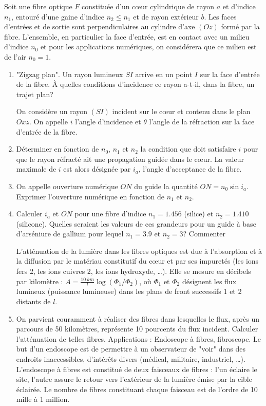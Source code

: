 \begin{exercice}%
  Soit une fibre optique \(F\) constituée d'un cœur cylindrique de rayon 
  \(a\) et d'indice \(n_1\), entouré d'une gaine d'indice \(n_2 \leq n_1\) et 
  de rayon extérieur \(b\). Les faces d'entrées et de sortie sont 
  perpendiculaires au cylindre d'axe \((Oz)\) formé par la fibre. L'ensemble, 
  en particulier la face d'entrée, est en contact avec un milieu d'indice 
  \(n_0\) et pour les applications numériques, on considérera que ce milieu 
  est de l'air \(n_0=1\).
  \begin{enumerate}
    \item "Zigzag plan". Un rayon lumineux \(SI\) arrive en un point \(I\) 
      sur la face d'entrée de la fibre. À quelles conditions d'incidence ce 
      rayon a-t-il, dans la fibre, un trajet plan?

      On considère un rayon \((SI)\) incident sur le cœur et contenu dans le 
      plan \(Oxz\). On appelle \(i\) l'angle d'incidence et \(\theta\) 
      l'angle de la réfraction sur la face d'entrée de la fibre.
    \item Déterminer en fonction de \(n_0\), \(n_1\) et \(n_2\) la 
      condition que doit satisfaire \(i\) pour que le rayon réfracté ait 
      une propagation guidée dans le c\oe{}ur. La valeur maximale de \(i\) est 
      alors désignée par \(i_a\), l'angle d'acceptance de la fibre.
    \item On appelle ouverture numérique \(ON\) du guide la quantité 
      \(ON=n_0 \sin i_a\). Exprimer l'ouverture numérique en fonction de 
      \(n_1\) et \(n_2\).
    \item Calculer \(i_a\) et \(ON\) pour une fibre d'indice \(n_1=1.456\) 
      (silice) et \(n_2=1.410\) (silicone). Quelles seraient les valeurs de 
      ces grandeurs pour un guide à base d'arséniure de gallium pour lequel 
      \(n_1=3.9\) et \(n_2=3\)? Commenter

      L'atténuation de la lumière dans les fibres optiques est due à 
      l'absorption et à la diffusion par le matériau constitutif du cœur et 
      par ses impuretés (les ions fers 2, les ions cuivres 2, les ions 
      hydroxyde, \ldots). Elle se mesure en décibels par kilomètre : 
      \(A=\frac{\SI{10}{km}}{l} \log(\Phi_1/\Phi_2)\), où \(\Phi_1\) et 
      \(\Phi_2\) désignent les flux lumineux (puissance lumineuse) dans les 
      plans de front successifs 1 et 2 distants de \(l\).

    \item On parvient couramment à réaliser des fibres dans lesquelles le 
      flux, après un parcours de 50 kilomètres, représente 10 pourcents du 
      flux incident. Calculer l'atténuation de telles fibres. Applications 
      : Endoscope à fibres, fibroscope. Le but d'un endoscope est de 
      permettre à un observateur de "voir" dans des endroits inaccessibles, 
      d'intérêts divers (médical, militaire, industriel, \ldots). 
      L'endoscope à fibres est constitué de deux faisceaux de fibres : l'un 
      éclaire le site, l'autre assure le retour vers l'extérieur de la 
      lumière émise par la cible éclairée. Le nombre de fibres constituant 
      chaque faisceau est de l'ordre de 10 mille à 1 million.


\end{enumerate}
\end{exercice}
